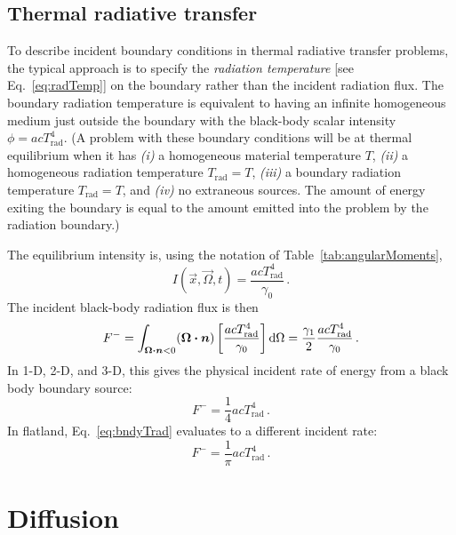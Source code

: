 \subsection{Thermal radiative transfer}\label{sec:trtBoundaryTemp}

To describe incident boundary conditions in thermal radiative transfer
problems, the typical approach is to specify the \emph{radiation temperature}
[see Eq.~\eqref{eq:radTemp}] on the boundary rather than the incident
radiation flux. The boundary radiation temperature is equivalent to having an
infinite homogeneous medium just outside the boundary with the black-body scalar
intensity $\phi=ac T_\text{rad}^4$. (A problem with these boundary conditions
will be at thermal equilibrium when it has \textsl{(i)} a homogeneous material
temperature $T$, \textsl{(ii)} a homogeneous radiation temperature
$T_\text{rad}=T$, \textsl{(iii)} a boundary radiation temperature $T_\text{rad}
= T$, and \textsl{(iv)} no extraneous sources. The amount of energy exiting the
boundary is equal to the amount emitted into the problem by the radiation
boundary.)

The equilibrium intensity is, using the notation of
Table~\ref{tab:angularMoments},
\begin{equation*}
  I(\vec{x},\vec{\Omega}, t) = \frac{a c T_\text{rad}^4}{\gamma_0}\,.
\end{equation*}
The incident black-body radiation flux is then
\begin{equation}\label{eq:bndyTrad}
  F^- = \int_{\bm{\Omega}\bm{\cdot}\bm{n} < 0} (\bm{\Omega}\bm{\cdot} \bm{n})
  \left[ \frac{a c T_\text{rad}^4}{\gamma_0} \right] \mathop{}\!\mathrm{d}\Omega
  = \frac{\gamma_1}{2} \frac{a c T_\text{rad}^4}{\gamma_0} \,.
\end{equation}
In 1-D, 2-D, and 3-D, this gives the physical incident rate of energy from a
black body boundary source:
\begin{equation}\label{eq:bndyTrad3D}
  F^- = \frac{1}{4} a c T_\text{rad}^4 \,.
\end{equation}
In flatland, Eq.~\eqref{eq:bndyTrad} evaluates to a different incident rate:
\begin{equation}\label{eq:bndyTradFlatland}
  F^- = \frac{1}{\pi} a c T_\text{rad}^4 \,.
\end{equation}

\section{Diffusion}

